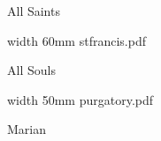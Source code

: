 \bigskip


\eject

\beginpart All Saints



\bigskip



\eject



\bigskip

\saveimageresource width 60mm {stfrancis.pdf}

\centerline{\useimageresource \lastsavedimageresourceindex}



\eject

\beginpart All Souls



\paginaproxima


\bigskip

\saveimageresource width 50mm {purgatory.pdf}

\centerline{\useimageresource \lastsavedimageresourceindex}



\eject

\beginpart Marian


\bigskip



\paginaproxima

%


%




\bigskip




\eject


\paginaproxima



